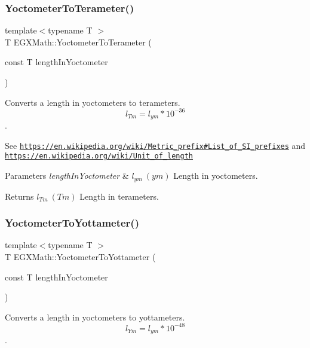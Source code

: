 \subsubsection{\texorpdfstring{Yoctometer\+To\+Terameter()}{YoctometerToTerameter()}}
{\footnotesize\ttfamily template$<$typename T $>$ \\
T E\+G\+X\+Math\+::\+Yoctometer\+To\+Terameter (\begin{DoxyParamCaption}\item[{const T}]{length\+In\+Yoctometer }\end{DoxyParamCaption})}



Converts a length in yoctometers to terameters. \[ l_{Tm}=l_{ym} * 10^{-36} \]. 

See \href{https://en.wikipedia.org/wiki/Metric_prefix#List_of_SI_prefixes}{\tt https\+://en.\+wikipedia.\+org/wiki/\+Metric\+\_\+prefix\#\+List\+\_\+of\+\_\+\+S\+I\+\_\+prefixes} and \href{https://en.wikipedia.org/wiki/Unit_of_length}{\tt https\+://en.\+wikipedia.\+org/wiki/\+Unit\+\_\+of\+\_\+length} 
\begin{DoxyParams}{Parameters}
{\em length\+In\+Yoctometer} & $ l_{ym}\ (ym)$ Length in yoctometers. \\
\hline
\end{DoxyParams}
\begin{DoxyReturn}{Returns}
$ l_{Tm}\ (Tm)$ Length in terameters. 
\end{DoxyReturn}
\mbox{\label{group___e_g_x_math-_conversions-_length_conversions-_s_i-_yoctometer-_s_i_ga6b9cdc15eb83cf15afe2a52430c84dc0}} 
\subsubsection{\texorpdfstring{Yoctometer\+To\+Yottameter()}{YoctometerToYottameter()}}
{\footnotesize\ttfamily template$<$typename T $>$ \\
T E\+G\+X\+Math\+::\+Yoctometer\+To\+Yottameter (\begin{DoxyParamCaption}\item[{const T}]{length\+In\+Yoctometer }\end{DoxyParamCaption})}



Converts a length in yoctometers to yottameters. \[ l_{Ym}=l_{ym} * 10^{-48} \]. 

